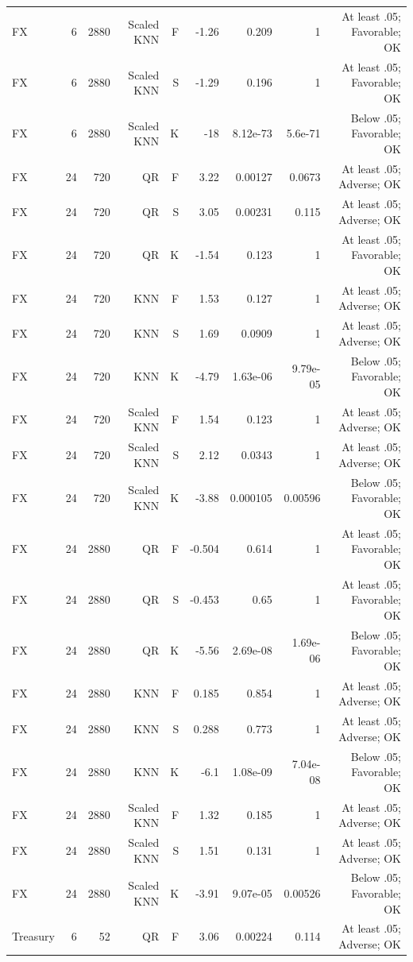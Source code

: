 \documentclass[10pt,a4paper]{article}
\begin{document}
\begin{center}
\begin{minipage}{\linewidth}
\begin{tabular}{lrrrrrrrr}
FX & 6 & 2880 & Scaled KNN & F & -1.26 & 0.209 & 1 & At least .05; Favorable; OK \\
FX & 6 & 2880 & Scaled KNN & S & -1.29 & 0.196 & 1 & At least .05; Favorable; OK \\
FX & 6 & 2880 & Scaled KNN & K & -18 & 8.12e-73 & 5.6e-71 & Below .05; Favorable; OK \\
FX & 24 & 720 & QR & F & 3.22 & 0.00127 & 0.0673 & At least .05; Adverse; OK \\
FX & 24 & 720 & QR & S & 3.05 & 0.00231 & 0.115 & At least .05; Adverse; OK \\
FX & 24 & 720 & QR & K & -1.54 & 0.123 & 1 & At least .05; Favorable; OK \\
FX & 24 & 720 & KNN & F & 1.53 & 0.127 & 1 & At least .05; Adverse; OK \\
FX & 24 & 720 & KNN & S & 1.69 & 0.0909 & 1 & At least .05; Adverse; OK \\
FX & 24 & 720 & KNN & K & -4.79 & 1.63e-06 & 9.79e-05 & Below .05; Favorable; OK \\
FX & 24 & 720 & Scaled KNN & F & 1.54 & 0.123 & 1 & At least .05; Adverse; OK \\
FX & 24 & 720 & Scaled KNN & S & 2.12 & 0.0343 & 1 & At least .05; Adverse; OK \\
FX & 24 & 720 & Scaled KNN & K & -3.88 & 0.000105 & 0.00596 & Below .05; Favorable; OK \\
FX & 24 & 2880 & QR & F & -0.504 & 0.614 & 1 & At least .05; Favorable; OK \\
FX & 24 & 2880 & QR & S & -0.453 & 0.65 & 1 & At least .05; Favorable; OK \\
FX & 24 & 2880 & QR & K & -5.56 & 2.69e-08 & 1.69e-06 & Below .05; Favorable; OK \\
FX & 24 & 2880 & KNN & F & 0.185 & 0.854 & 1 & At least .05; Adverse; OK \\
FX & 24 & 2880 & KNN & S & 0.288 & 0.773 & 1 & At least .05; Adverse; OK \\
FX & 24 & 2880 & KNN & K & -6.1 & 1.08e-09 & 7.04e-08 & Below .05; Favorable; OK \\
FX & 24 & 2880 & Scaled KNN & F & 1.32 & 0.185 & 1 & At least .05; Adverse; OK \\
FX & 24 & 2880 & Scaled KNN & S & 1.51 & 0.131 & 1 & At least .05; Adverse; OK \\
FX & 24 & 2880 & Scaled KNN & K & -3.91 & 9.07e-05 & 0.00526 & Below .05; Favorable; OK \\
Treasury & 6 & 52 & QR & F & 3.06 & 0.00224 & 0.114 & At least .05; Adverse; OK \\

\end{tabular}
\end{minipage}
\end{center}
\end{document}
